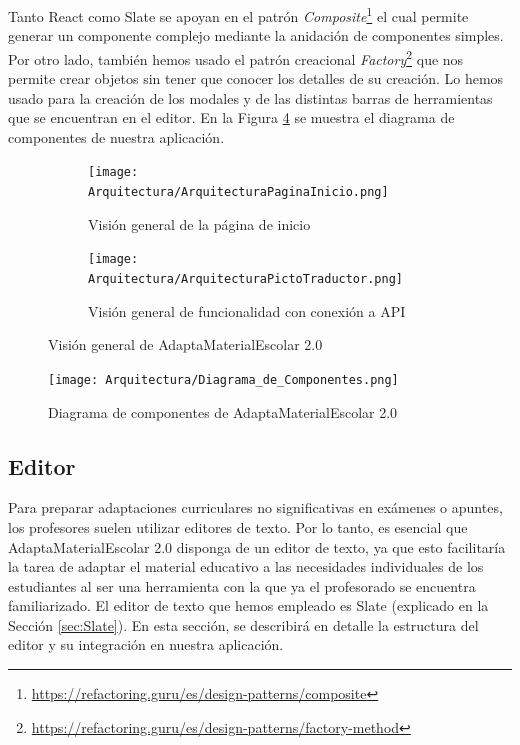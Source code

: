 Tanto React como Slate se apoyan en el patrón \textit{Composite}\footnote{\url{https://refactoring.guru/es/design-patterns/composite}} el cual permite generar un componente complejo mediante la anidación de componentes simples. Por otro lado, también hemos usado el patrón creacional \textit{Factory}\footnote{\url{https://refactoring.guru/es/design-patterns/factory-method}} que nos permite crear objetos sin tener que conocer los detalles de su creación. Lo hemos usado para la creación de los modales y de las distintas barras de herramientas que se encuentran en el editor. En la Figura \ref{fig:diagramaComponentes} se muestra el diagrama de componentes de nuestra aplicación.
\begin{figure}[ht!]
  \centering
  \begin{subfigure}{\textwidth}
    \centering
    \texttt{[image: Arquitectura/ArquitecturaPaginaInicio.png]}
    \caption{Visión general de la página de inicio}
    \label{fig:arquitecturageneral1}
  \end{subfigure}

  \begin{subfigure}{\textwidth}
    \centering
    \texttt{[image: Arquitectura/ArquitecturaPictoTraductor.png]}
    \caption{Visión general de funcionalidad con conexión a API}
    \label{fig:arquitecturageneral2}
  \end{subfigure}
  \caption{Visión general de AdaptaMaterialEscolar 2.0}
  \label{fig:arquitecturageneral}
\end{figure}

\begin{figure}[ht!]
  \centering
  \texttt{[image: Arquitectura/Diagrama\_de\_Componentes.png]}
  \caption{Diagrama de componentes de AdaptaMaterialEscolar 2.0}
  \label{fig:diagramaComponentes}
\end{figure}

\subsection{Editor}
\label{Editor}
Para preparar adaptaciones curriculares no significativas en exámenes o apuntes, los profesores suelen utilizar editores de texto. Por lo tanto, es esencial que AdaptaMaterialEscolar 2.0 disponga de un editor de texto, ya que esto facilitaría la tarea de adaptar el material educativo a las necesidades individuales de los estudiantes al ser una herramienta con la que ya el profesorado se encuentra familiarizado. El editor de texto que hemos empleado es Slate (explicado en la Sección \ref{sec:Slate}). En esta sección, se describirá en detalle la estructura del editor y su integración en nuestra aplicación.

